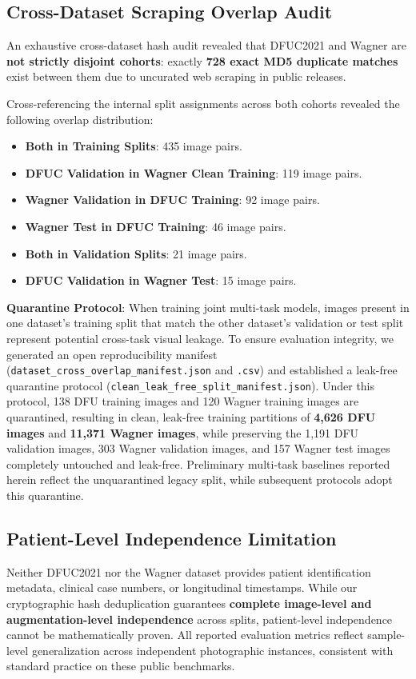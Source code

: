 \documentclass[journal]{IEEEtran}
\begin{document}
\subsection{Cross-Dataset Scraping Overlap Audit}
An exhaustive cross-dataset hash audit revealed that DFUC2021 and Wagner are \textbf{not strictly disjoint cohorts}: exactly \textbf{728 exact MD5 duplicate matches} exist between them due to uncurated web scraping in public releases. 

Cross-referencing the internal split assignments across both cohorts revealed the following overlap distribution:
\begin{itemize}
    \item \textbf{Both in Training Splits}: 435 image pairs.
    \item \textbf{DFUC Validation in Wagner Clean Training}: 119 image pairs.
    \item \textbf{Wagner Validation in DFUC Training}: 92 image pairs.
    \item \textbf{Wagner Test in DFUC Training}: 46 image pairs.
    \item \textbf{Both in Validation Splits}: 21 image pairs.
    \item \textbf{DFUC Validation in Wagner Test}: 15 image pairs.
\end{itemize}

\textbf{Quarantine Protocol}: When training joint multi-task models, images present in one dataset's training split that match the other dataset's validation or test split represent potential cross-task visual leakage. To ensure evaluation integrity, we generated an open reproducibility manifest (\texttt{dataset\_cross\_overlap\_manifest.json} and \texttt{.csv}) and established a leak-free quarantine protocol (\texttt{clean\_leak\_free\_split\_manifest.json}). Under this protocol, 138 DFU training images and 120 Wagner training images are quarantined, resulting in clean, leak-free training partitions of \textbf{4,626 DFU images} and \textbf{11,371 Wagner images}, while preserving the 1,191 DFU validation images, 303 Wagner validation images, and 157 Wagner test images completely untouched and leak-free. Preliminary multi-task baselines reported herein reflect the unquarantined legacy split, while subsequent protocols adopt this quarantine.

\subsection{Patient-Level Independence Limitation}
Neither DFUC2021 nor the Wagner dataset provides patient identification metadata, clinical case numbers, or longitudinal timestamps. While our cryptographic hash deduplication guarantees \textbf{complete image-level and augmentation-level independence} across splits, patient-level independence cannot be mathematically proven. All reported evaluation metrics reflect sample-level generalization across independent photographic instances, consistent with standard practice on these public benchmarks.
\end{document}

